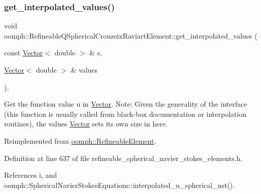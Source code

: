 \subsubsection{\texorpdfstring{get\+\_\+interpolated\+\_\+values()}{get\_interpolated\_values()}\hspace{0.1cm}{\footnotesize\ttfamily [1/2]}}
{\footnotesize\ttfamily void oomph\+::\+Refineable\+Q\+Spherical\+Crouzeix\+Raviart\+Element\+::get\+\_\+interpolated\+\_\+values (\begin{DoxyParamCaption}\item[{const \hyperlink{classoomph_1_1Vector}{Vector}$<$ double $>$ \&}]{s,  }\item[{\hyperlink{classoomph_1_1Vector}{Vector}$<$ double $>$ \&}]{values }\end{DoxyParamCaption})\hspace{0.3cm}{\ttfamily [inline]}, {\ttfamily [virtual]}}



Get the function value u in \hyperlink{classoomph_1_1Vector}{Vector}. Note\+: Given the generality of the interface (this function is usually called from black-\/box documentation or interpolation routines), the values \hyperlink{classoomph_1_1Vector}{Vector} sets its own size in here. 



Reimplemented from \hyperlink{classoomph_1_1RefineableElement_ad9a4f92880668a2373326d8306365c43}{oomph\+::\+Refineable\+Element}.



Definition at line 637 of file refineable\+\_\+spherical\+\_\+navier\+\_\+stokes\+\_\+elements.\+h.



References i, and oomph\+::\+Spherical\+Navier\+Stokes\+Equations\+::interpolated\+\_\+u\+\_\+spherical\+\_\+nst().

\mbox{\label{classoomph_1_1RefineableQSphericalCrouzeixRaviartElement_a3af230cefbdc3d938f90251a8269a9b4}} 
